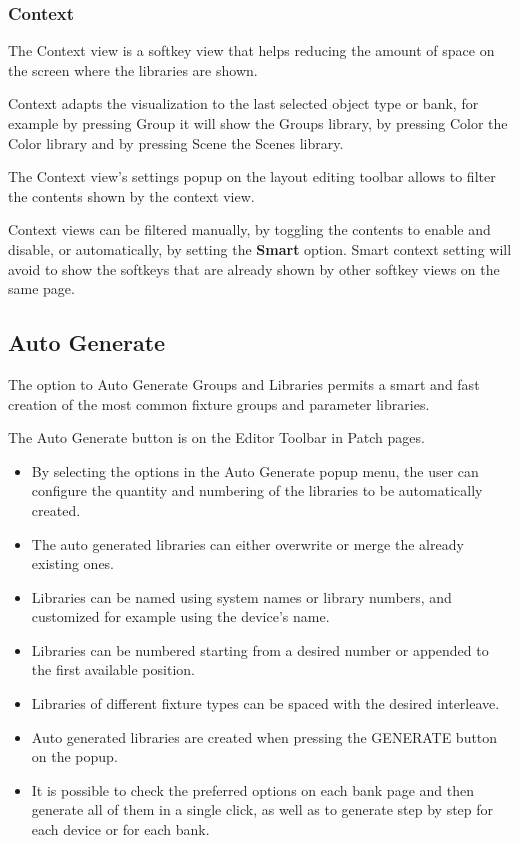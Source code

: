 \documentclass[
]{article}
\begin{document}
\hypertarget{context}{%
\subsubsection{Context}\label{context}}

The Context view is a softkey view that helps reducing the amount of space on the screen where the libraries are shown.

Context adapts the visualization to the last selected object type or bank, for example by pressing Group it will show the Groups library, by pressing Color the Color library and by pressing Scene the Scenes library.

The Context view's settings popup on the layout editing toolbar allows to filter the contents shown by the context view.

Context views can be filtered manually, by toggling the contents to enable and disable, or automatically, by setting the \textbf{Smart} option. Smart context setting will avoid to show the softkeys that are already shown by other softkey views on the same page.

\hypertarget{Auto-Generate-8.2}{%
\subsection{Auto Generate}\label{Auto-Generate-8.2}}

The option to Auto Generate Groups and Libraries permits a smart and fast creation of the most common fixture groups and parameter libraries.

The Auto Generate button is on the Editor Toolbar in Patch pages.

\begin{itemize}
\item
  By selecting the options in the Auto Generate popup menu, the user can configure the quantity and numbering of the libraries to be automatically created.
\item
  The auto generated libraries can either overwrite or merge the already existing ones.
\item
  Libraries can be named using system names or library numbers, and customized for example using the device's name.
\item
  Libraries can be numbered starting from a desired number or appended to the first available position.
\item
  Libraries of different fixture types can be spaced with the desired interleave.
\item
  Auto generated libraries are created when pressing the GENERATE button on the popup.
\item
  It is possible to check the preferred options on each bank page and then generate all of them in a single click, as well as to generate step by step for each device or for each bank.
\end{itemize}
\end{document}
